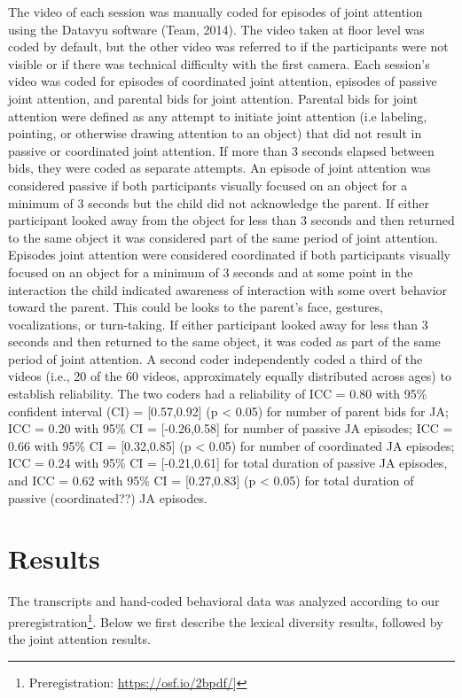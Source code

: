 \documentclass[10pt, letterpaper]{article}
\begin{document}
The video of each session was manually coded for episodes of joint
attention using the Datavyu software (Team, 2014). The video taken at
floor level was coded by default, but the other video was referred to if
the participants were not visible or if there was technical difficulty
with the first camera. Each session's video was coded for episodes of
coordinated joint attention, episodes of passive joint attention, and
parental bids for joint attention. Parental bids for joint attention
were defined as any attempt to initiate joint attention (i.e labeling,
pointing, or otherwise drawing attention to an object) that did not
result in passive or coordinated joint attention. If more than 3 seconds
elapsed between bids, they were coded as separate attempts. An episode
of joint attention was considered passive if both participants visually
focused on an object for a minimum of 3 seconds but the child did not
acknowledge the parent. If either participant looked away from the
object for less than 3 seconds and then returned to the same object it
was considered part of the same period of joint attention. Episodes
joint attention were considered coordinated if both participants
visually focused on an object for a minimum of 3 seconds and at some
point in the interaction the child indicated awareness of interaction
with some overt behavior toward the parent. This could be looks to the
parent's face, gestures, vocalizations, or turn-taking. If either
participant looked away for less than 3 seconds and then returned to the
same object, it was coded as part of the same period of joint attention.
A second coder independently coded a third of the videos (i.e., 20 of
the 60 videos, approximately equally distributed across ages) to
establish reliability. The two coders had a reliability of ICC = 0.80
with 95\% confident interval (CI) = {[}0.57,0.92{]} (p \textless{} 0.05)
for number of parent bids for JA; ICC = 0.20 with 95\% CI =
{[}-0.26,0.58{]} for number of passive JA episodes; ICC = 0.66 with 95\%
CI = {[}0.32,0.85{]} (p \textless{} 0.05) for number of coordinated JA
episodes; ICC = 0.24 with 95\% CI = {[}-0.21,0.61{]} for total duration
of passive JA episodes, and ICC = 0.62 with 95\% CI = {[}0.27,0.83{]} (p
\textless{} 0.05) for total duration of passive (coordinated??) JA
episodes.

\section{Results}\label{results}

The transcripts and hand-coded behavioral data was analyzed according to
our preregistration\footnote{Preregistration:
  \url{https://osf.io/2bpdf/}{]}}. Below we first describe the lexical
diversity results, followed by the joint attention results.
\end{document}

